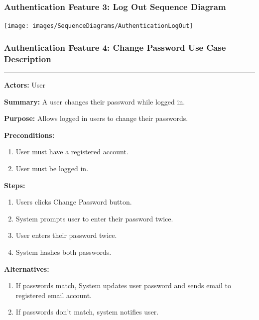 \documentclass[twoside,letterpaper]{article}
\begin{document}
\subsubsection[Authentication Feature 3: Log Out Sequence Diagram]{\rmfamily\bfseries\color{black}
	Authentication Feature 3: Log Out Sequence Diagram}
\hypertarget{RefHeading22059017292}{}

\bigskip

\texttt{[image: images/SequenceDiagrams/AuthenticationLogOut]}

\newpage

\subsubsection[Authentication Feature 4: Change Password Use Case Description]{\rmfamily\bfseries\color{black}
	Authentication Feature 4: Change Password Use Case Description}
\hypertarget{RefHeading22059017292}{}

\hrule
\vspace{8pt}
\noindent\textbf{Actors:} User \newline

\noindent\textbf{Summary:} A user changes their password while logged in.  \newline

\noindent\textbf{Purpose:} Allows logged in users to change their passwords.  \newline

\noindent\textbf{Preconditions:}
\begin{enumerate}
	\item User must have a registered account.
	\item User must be logged in.
\end{enumerate}

\noindent\textbf{Steps:}
\begin{enumerate}
	\item Users clicks Change Password button.
	\item System prompts user to enter their password twice.
	\item User enters their password twice.
	\item System hashes both passwords.
\end{enumerate}

\noindent\textbf{Alternatives:}
\begin{enumerate}
	\item If passwords match, System updates user password and sends email to registered email account.
	\item If passwords don't match, system notifies user.
\end{enumerate}
\end{document}
